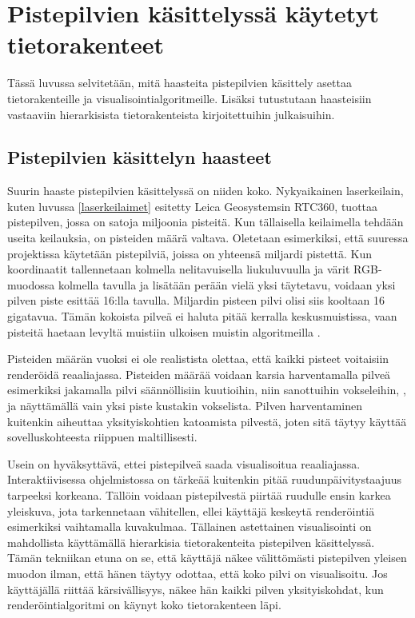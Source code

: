 \section{Pistepilvien käsittelyssä käytetyt tietorakenteet}\label{kirjallisuus}

Tässä luvussa selvitetään, mitä haasteita pistepilvien käsittely asettaa tietorakenteille ja visualisointialgoritmeille. Lisäksi tutustutaan haasteisiin vastaaviin hierarkisista tietorakenteista kirjoitettuihin julkaisuihin.

\subsection{Pistepilvien käsittelyn haasteet}

Suurin haaste pistepilvien käsittelyssä on niiden koko. Nykyaikainen laserkeilain, kuten luvussa \ref{laserkeilaimet} esitetty Leica Geosystemsin RTC360, tuottaa pistepilven, jossa on satoja miljoonia pisteitä. Kun tällaisella keilaimella tehdään useita keilauksia, on pisteiden määrä valtava. Oletetaan esimerkiksi, että suuressa projektissa käytetään pistepilviä, joissa on yhteensä miljardi pistettä. Kun koordinaatit tallennetaan kolmella nelitavuisella liukuluvuulla ja värit RGB-muodossa kolmella tavulla ja lisätään perään vielä yksi täytetavu, voidaan yksi pilven piste esittää 16:lla tavulla. Miljardin pisteen pilvi olisi siis kooltaan 16 gigatavua. Tämän kokoista pilveä ei haluta pitää kerralla keskusmuistissa, vaan pisteitä haetaan levyltä muistiin ulkoisen muistin algoritmeilla .

Pisteiden määrän vuoksi ei ole realistista olettaa, että kaikki pisteet voitaisiin renderöidä reaaliajassa. Pisteiden määrää voidaan karsia harventamalla pilveä esimerkiksi jakamalla pilvi säännöllisiin kuutioihin, niin sanottuihin vokseleihin, , ja näyttämällä vain yksi piste kustakin vokselista. %
Pilven harventaminen kuitenkin aiheuttaa yksityiskohtien katoamista pilvestä, joten sitä täytyy käyttää sovelluskohteesta riippuen maltillisesti. 

Usein on hyväksyttävä, ettei pistepilveä saada visualisoitua reaaliajassa. Interaktiivisessa ohjelmistossa on tärkeää kuitenkin pitää ruudunpäivitystaajuus tarpeeksi korkeana. Tällöin voidaan pistepilvestä piirtää ruudulle ensin karkea yleiskuva, jota tarkennetaan vähitellen, ellei käyttäjä keskeytä renderöintiä esimerkiksi vaihtamalla kuvakulmaa. Tällainen astettainen visualisointi on mahdollista käyttämällä hierarkisia tietorakenteita pistepilven käsittelyssä. Tämän tekniikan etuna on se, että käyttäjä näkee välittömästi pistepilven yleisen muodon ilman, että hänen täytyy odottaa, että koko pilvi on visualisoitu. Jos käyttäjällä riittää kärsivällisyys, näkee hän kaikki pilven yksityiskohdat, kun renderöintialgoritmi on käynyt koko tietorakenteen läpi. 


